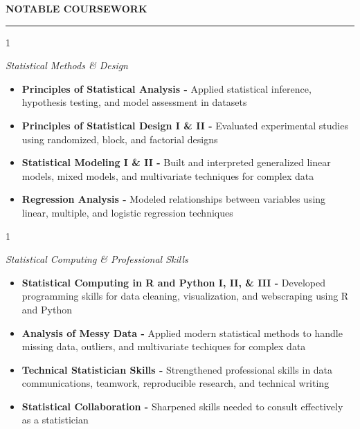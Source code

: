\documentclass[
  16,
]{article}
\begin{document}
\vspace{3pt}

\begin{large}{\bf NOTABLE COURSEWORK}
  \vspace{3pt}
  \hrule  
  \begin{multicols}{1}
    \begin{flushleft}\textit{Statistical Methods \& Design}
    \end{flushleft}
  \end{multicols}
  \vspace{-0.17cm}
\end{large}
\vspace{-0.16cm}

\begin{itemize}
\item
  \textbf{Principles of Statistical Analysis -} Applied statistical
  inference, hypothesis testing, and model assessment in datasets
\item
  \textbf{Principles of Statistical Design I \& II -} Evaluated
  experimental studies using randomized, block, and factorial designs
\item
  \textbf{Statistical Modeling I \& II -} Built and interpreted
  generalized linear models, mixed models, and multivariate techniques
  for complex data
\item
  \textbf{Regression Analysis -} Modeled relationships between variables
  using linear, multiple, and logistic regression techniques
\end{itemize}

\begin{large}
\begin{multicols}{1}
  \begin{flushleft}\textit{Statistical Computing \& Professional Skills}
    \end{flushleft}
  \end{multicols}
  \vspace{-0.17cm}
\end{large}
\vspace{-0.16cm}

\begin{itemize}
\item
  \textbf{Statistical Computing in R and Python I, II, \& III -}
  Developed programming skills for data cleaning, visualization, and
  webscraping using R and Python
\item
  \textbf{Analysis of Messy Data -} Applied modern statistical methods
  to handle missing data, outliers, and multivariate techiques for
  complex data
\item
  \textbf{Technical Statistician Skills -} Strengthened professional
  skills in data communications, teamwork, reproducible research, and
  technical writing
\item
  \textbf{Statistical Collaboration -} Sharpened skills needed to
  consult effectively as a statistician
\end{itemize}
\end{document}
